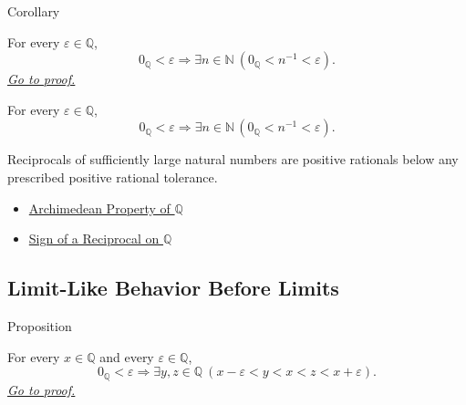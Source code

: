 \begin{corollarybox}{Corollary}
\begin{corollary}
\label{cor:reciprocals-arbitrarily-small-q}
For every $\varepsilon\in\mathbb{Q}$,
\[
0_{\mathbb{Q}}<\varepsilon
\Longrightarrow
\exists n\in\mathbb{N}\ 
\left(0_{\mathbb{Q}}<n^{-1}<\varepsilon\right).
\]
\hyperref[prf:reciprocals-arbitrarily-small-q]{\textit{Go to proof.}}
\end{corollary}
\end{corollarybox}

\begin{remark*}
For every $\varepsilon\in\mathbb{Q}$,
\[
0_{\mathbb{Q}}<\varepsilon
\Longrightarrow
\exists n\in\mathbb{N}\,
\left(0_{\mathbb{Q}}<n^{-1}<\varepsilon\right).
\]
\end{remark*}

\begin{remark*}[Interpretation]
Reciprocals of sufficiently large natural numbers are positive rationals below
any prescribed positive rational tolerance.
\end{remark*}

\begin{dependencies}
\begin{itemize}
  \item \hyperref[thm:archimedean-property-of-q]{Archimedean Property of $\mathbb{Q}$}
  \item \hyperref[thm:sign-of-reciprocal-q]{Sign of a Reciprocal on $\mathbb{Q}$}
\end{itemize}
\end{dependencies}

\subsection*{Limit-Like Behavior Before Limits}

\begin{propositionbox}{Proposition}
\begin{proposition}
\label{prop:one-sided-rational-approximation}
For every $x\in\mathbb{Q}$ and every $\varepsilon\in\mathbb{Q}$,
\[
0_{\mathbb{Q}}<\varepsilon
\Longrightarrow
\exists y,z\in\mathbb{Q}\ (x-\varepsilon<y<x<z<x+\varepsilon).
\]
\hyperref[prf:one-sided-rational-approximation]{\textit{Go to proof.}}
\end{proposition}
\end{propositionbox}

